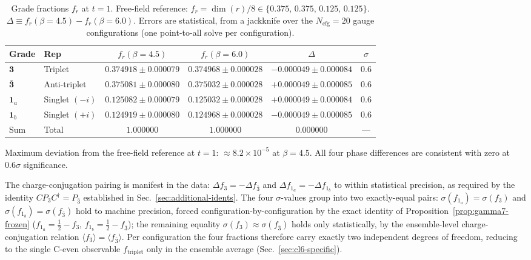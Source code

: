 \documentclass[12pt]{article}
\theoremstyle{definition}
\theoremstyle{remark}
\newcommand{\half}{\tfrac{1}{2}}
\newcommand{\ftriplet}{f_{\mathrm{triplet}}}          %
\newcommand{\Ncfg}{N_{\mathrm{cfg}}}                  %
\begin{document}
	\begin{table}[ht]
		\centering
		\caption{Grade fractions $f_r$ at $t=1$.  Free-field reference:
			$f_r=\dim(r)/8\in\{0.375,\,0.375,\,0.125,\,0.125\}$.
			$\Delta\equiv f_r(\beta{=}4.5)-f_r(\beta{=}6.0)$.
			Errors are statistical, from a jackknife over the $\Ncfg=20$ gauge configurations (one point-to-all solve per configuration).}
		\label{tab:grade-fractions}
		\begin{tabular}{@{}llcccc@{}}
			\toprule
			Grade & Rep              & $f_r(\beta=4.5)$        & $f_r(\beta=6.0)$
			& $\Delta$                & $\sigma$ \\
			\midrule
			$\mathbf{3}$
			& Triplet
			& $0.374918\pm0.000079$
			& $0.374968\pm0.000028$
			& $-0.000049\pm0.000084$
			& $0.6$ \\[3pt]
			$\bar{\mathbf{3}}$
			& Anti-triplet
			& $0.375081\pm0.000080$
			& $0.375032\pm0.000028$
			& $+0.000049\pm0.000085$
			& $0.6$ \\[3pt]
			$\mathbf{1}_a$
			& Singlet $(-i)$
			& $0.125082\pm0.000079$
			& $0.125032\pm0.000028$
			& $+0.000049\pm0.000084$
			& $0.6$ \\[3pt]
			$\mathbf{1}_b$
			& Singlet $(+i)$
			& $0.124919\pm0.000080$
			& $0.124968\pm0.000028$
			& $-0.000049\pm0.000085$
			& $0.6$ \\
			\midrule
			Sum & Total
			& $1.000000$
			& $1.000000$
			& $0.000000$
			& — \\
			\bottomrule
		\end{tabular}
	\end{table}
	
	Maximum deviation from the free-field reference at $t=1$:
	$\approx8.2\times10^{-5}$
	at $\beta=4.5$.  All four phase differences are consistent with zero at
	$0.6\sigma$ significance.
	
	The charge-conjugation pairing is manifest in the data: $\Delta f_3 =
	-\Delta f_{\bar{3}}$ and $\Delta f_{1_a} = -\Delta f_{1_b}$ to within
	statistical precision, as required by the identity $CP_3 C^\dagger =
	P_{\bar{3}}$ established in Sec.~\ref{sec:additional-idents}.  The four
	$\sigma$-values group into two exactly-equal pairs:
	$\sigma(f_{1_a})=\sigma(f_3)$ and $\sigma(f_{1_b})=\sigma(f_{\bar 3})$ hold
	to machine precision, forced configuration-by-configuration by the exact
	identity of Proposition~\ref{prop:gamma7-frozen}
	($f_{1_a}=\half-f_3$, $f_{1_b}=\half-f_{\bar 3}$); the remaining equality
	$\sigma(f_3)\approx\sigma(f_{\bar 3})$ holds only statistically, by the
	ensemble-level charge-conjugation relation
	$\langle f_3\rangle=\langle f_{\bar 3}\rangle$.  Per configuration the four
	fractions therefore carry exactly two independent degrees of freedom,
	reducing to the single C-even observable $\ftriplet$ only in the ensemble
	average (Sec.~\ref{sec:cl6-specific}).
	
\end{document}
